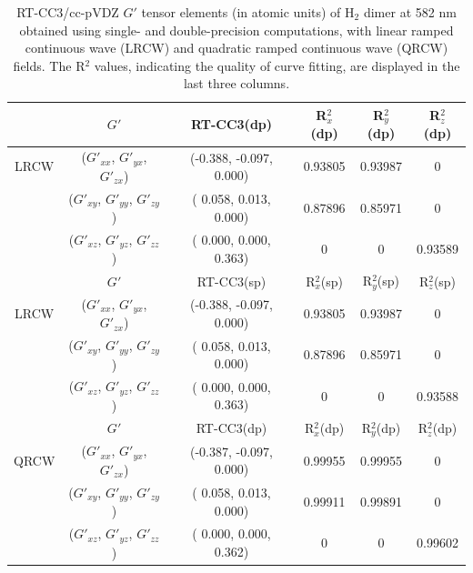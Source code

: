 \begin{table}
  \centering
    \caption{RT-CC3/cc-pVDZ $G'$ tensor elements (in atomic units) of H$_{2}$ dimer at 582 nm obtained using single- and double-precision computations, with linear ramped continuous wave (LRCW) and quadratic ramped continuous wave (QRCW) fields. The R$^{2}$ values, indicating the quality of curve fitting, are displayed in the last three columns.}
  \begin{tabular}{c|c|c|ccc}
                                          &  $G'$ & \textrm{RT-CC3(dp)} & R$^{2}_{x}$(dp) & R$^{2}_{y}$(dp)& R$^{2}_{z}$(dp)\\
                                          \hline
                \textrm{LRCW} & ($G'_{xx}$, $G'_{yx}$, $G'_{zx}$) & (-0.388, -0.097, 0.000) &   0.93805 & 0.93987 & 0 \\
                                          & ($G'_{xy}$, $G'_{yy}$, $G'_{zy}$) & ( 0.058,  0.013, 0.000) &   0.87896 & 0.85971 & 0\\
                                          & ($G'_{xz}$, $G'_{yz}$, $G'_{zz}$) & ( 0.000,  0.000, 0.363) &   0 & 0 & 0.93589 \\   
                \hline
                                           &  $G'$ & \textrm{RT-CC3(sp)} & R$^{2}_{x}$(sp) & R$^{2}_{y}$(sp)& R$^{2}_{z}$(sp)\\
                                          \hline
                \textrm{LRCW} & ($G'_{xx}$, $G'_{yx}$, $G'_{zx}$) & (-0.388, -0.097, 0.000) &   0.93805 & 0.93987 & 0 \\
                                          & ($G'_{xy}$, $G'_{yy}$, $G'_{zy}$) & ( 0.058,  0.013, 0.000) &   0.87896 & 0.85971 & 0 \\
                                          & ($G'_{xz}$, $G'_{yz}$, $G'_{zz}$) & ( 0.000,  0.000, 0.363) &   0 & 0 & 0.93588 \\  
                 \hline
                                            &  $G'$ & \textrm{RT-CC3(dp)} & R$^{2}_{x}$(dp) & R$^{2}_{y}$(dp)& R$^{2}_{z}$(dp)\\
                                          \hline
                \textrm{QRCW} & ($G'_{xx}$, $G'_{yx}$, $G'_{zx}$) & (-0.387, -0.097, 0.000) &   0.99955 & 0.99955 & 0 \\
                                          & ($G'_{xy}$, $G'_{yy}$, $G'_{zy}$) & ( 0.058,  0.013, 0.000) &   0.99911 & 0.99891 & 0 \\
                                          & ($G'_{xz}$, $G'_{yz}$, $G'_{zz}$) & ( 0.000,  0.000, 0.362) &   0 & 0 & 0.99602 \\  

\end{tabular}
\end{table}
